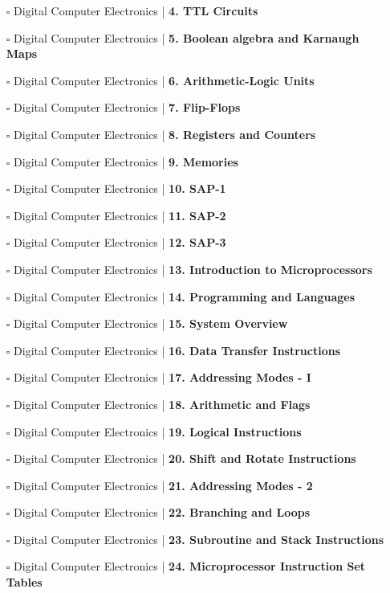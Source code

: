 \documentclass[a4, landscape, 12pt]{article}
\newcommand{\checkbox}{$\square$}%
\begin{document}
\begin{itemize}
{}
\item [\checkbox]  Digital Computer Electronics | \textbf{ 4. TTL Circuits
}
\item [\checkbox]  Digital Computer Electronics | \textbf{ 5. Boolean algebra and Karnaugh Maps
}
\item [\checkbox]  Digital Computer Electronics | \textbf{ 6. Arithmetic-Logic Units
}
\item [\checkbox]  Digital Computer Electronics | \textbf{ 7. Flip-Flops
}
\item [\checkbox]  Digital Computer Electronics | \textbf{ 8. Registers and Counters
}
\item [\checkbox]  Digital Computer Electronics | \textbf{ 9. Memories
}
\item [\checkbox]  Digital Computer Electronics | \textbf{ 10. SAP-1
}
\item [\checkbox]  Digital Computer Electronics | \textbf{ 11. SAP-2
}
\item [\checkbox]  Digital Computer Electronics | \textbf{ 12. SAP-3
}
\item [\checkbox]  Digital Computer Electronics | \textbf{ 13. Introduction to Microprocessors
}
\item [\checkbox]  Digital Computer Electronics | \textbf{ 14. Programming and Languages
}
\item [\checkbox]  Digital Computer Electronics | \textbf{ 15. System Overview
}
\item [\checkbox]  Digital Computer Electronics | \textbf{ 16. Data Transfer Instructions
}
\item [\checkbox]  Digital Computer Electronics | \textbf{ 17. Addressing Modes - I
}
\item [\checkbox]  Digital Computer Electronics | \textbf{ 18. Arithmetic and Flags
}
\item [\checkbox]  Digital Computer Electronics | \textbf{ 19. Logical Instructions
}
\item [\checkbox]  Digital Computer Electronics | \textbf{ 20. Shift and Rotate Instructions
}
\item [\checkbox]  Digital Computer Electronics | \textbf{ 21. Addressing Modes - 2
}
\item [\checkbox]  Digital Computer Electronics | \textbf{ 22. Branching and Loops
}
\item [\checkbox]  Digital Computer Electronics | \textbf{ 23. Subroutine and Stack Instructions
}
\item [\checkbox]  Digital Computer Electronics | \textbf{ 24. Microprocessor Instruction Set Tables
}
\end{itemize}
\end{document}
